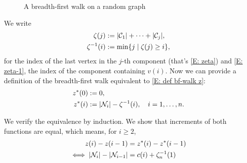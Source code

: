 \begin{figure}[H]
	\label{F: bf-walk}
	
	\centering
	\\
	
	\centering
	\\
	
	\centering
	
	\caption{A breadth-first walk on a random graph}
\end{figure} 


We write
\begin{align}
\zeta(j) &:= |\mathcal{C}_{1}| + \dots + |\mathcal{C}_{j}|, \label{E: zeta}\\ 
\zeta^{-1}(i) &:= \min \{ j \; | \; \zeta(j) \geq i \}, \label{E: zeta-1}
\end{align}
for the index of the last vertex in the $j$-th component (that's \eqref{E: zeta})
and \eqref{E: zeta-1}, the index of the component containing $v(i)$.
Now we can provide a definition of the breadth-first walk equivalent to \eqref{E: def bf-walk z}:
\begin{equation}  \label{E: def bf-walk z*}
\begin{aligned}
z^*(0) &:= 0, \\
z^*(i) &:= |\mathcal{N}_{i}| - \zeta^{-1}(i), \quad i=1, \dots , n.
\end{aligned}
\end{equation}

We verify the equivalence by induction.
We show that increments of both functions are equal,
which means, for $i \geq 2$,
\begin{equation}
\begin{aligned}
z(i) - z(i-1) &= z^*(i)  -z^*(i-1) \\
\iff |\mathcal{N}_{i}| - |\mathcal{N}_{i-1}| &= c(i) + \zeta^{-1}_n(1)
\end{aligned}
\end{equation}



